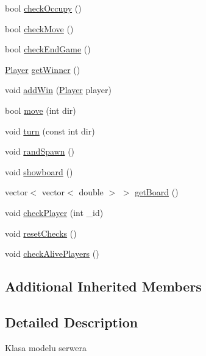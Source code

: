\begin{DoxyCompactItemize}
\item 
bool \hyperlink{classServerModel_addd72dd4e20c62633121da9e75907cf0}{check\-Occupy} ()
\item 
bool \hyperlink{classServerModel_acb1a12dd3af4d4ae84ce6a76742bc5b0}{check\-Move} ()
\item 
bool \hyperlink{classServerModel_a47fa5be84ddb9fe8095834d337d2dbff}{check\-End\-Game} ()
\item 
\hyperlink{classPlayer}{Player} \hyperlink{classServerModel_a7b23bfe191a3f618f260c781e5306e57}{get\-Winner} ()
\item 
void \hyperlink{classServerModel_ad3807bd9a40d361847ea0d1849f7fefc}{add\-Win} (\hyperlink{classPlayer}{Player} player)
\item 
bool \hyperlink{classServerModel_a2ed41cae52af16d5410b0669cce5fc7a}{move} (int dir)
\item 
void \hyperlink{classServerModel_a84fbe35ac950f1b71da800e14ac85814}{turn} (const int dir)
\item 
void \hyperlink{classServerModel_a30ce9865dba626f3aca22e6355d45a79}{rand\-Spawn} ()
\item 
void \hyperlink{classServerModel_a8f187ffda03256f2aa2679b22399d8ed}{showboard} ()
\item 
vector$<$ vector$<$ double $>$ $>$ \hyperlink{classServerModel_a0cdcac1cfe266b4fdaf9b0251a6f6553}{get\-Board} ()
\item 
void \hyperlink{classServerModel_a155230e9bb8373cfe4eaedbb87b05c0c}{check\-Player} (int \-\_\-id)
\item 
void \hyperlink{classServerModel_a402b44d30f2b3207154a67db4c28982f}{reset\-Checks} ()
\item 
void \hyperlink{classServerModel_aedccd8017caa1e8a9ed5a323d19d424e}{check\-Alive\-Players} ()
\end{DoxyCompactItemize}
\subsection*{Additional Inherited Members}


\subsection{Detailed Description}
Klasa modelu serwera 


